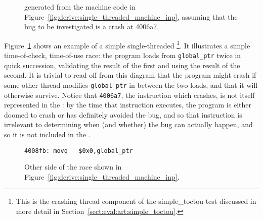 \begin{figure}
  \caption{{\StateMachine} generated from the machine code in
    Figure~\ref{fig:derive:single_threaded_machine_inp}, assuming that
    the bug to be investigated is a crash at 4006a7.}
  \label{fig:derive:single_threaded_machine}
\end{figure}

Figure~\ref{fig:derive:single_threaded_machine} shows an example of a
simple single-threaded {\StateMachine}\footnote{This is the crashing
  thread component of the simple\_toctou test discussed in more detail
  in Section~\ref{sect:eval:art:simple_toctou}.}.  It illustrates a
simple time-of-check, time-of-use race: the program loads from
\verb|global_ptr| twice in quick succession, validating the result of
the first and using the result of the second.  It is trivial to read
off from this diagram that the program might crash if some other
thread modifies \verb|global_ptr| in between the two loads, and that
it will otherwise survive.  Notice that \verb|4006a7|, the instruction
which crashes, is not itself represented in the : by the
time that instruction executes, the program is either doomed to crash
or has definitely avoided the bug, and so that instruction is
irrelevant to determining when (and whether) the bug can actually
happen, and so it is not included in the {\StateMachine}.

\begin{figure}[t]
\begin{verbatim}
4008fb: movq   $0x0,global_ptr
\end{verbatim}
\caption{Other side of the race shown in
  Figure~\ref{fig:derive:single_threaded_machine_inp}.}
\label{fig:derive:single_threaded_machine_write_inp}
\end{figure}

